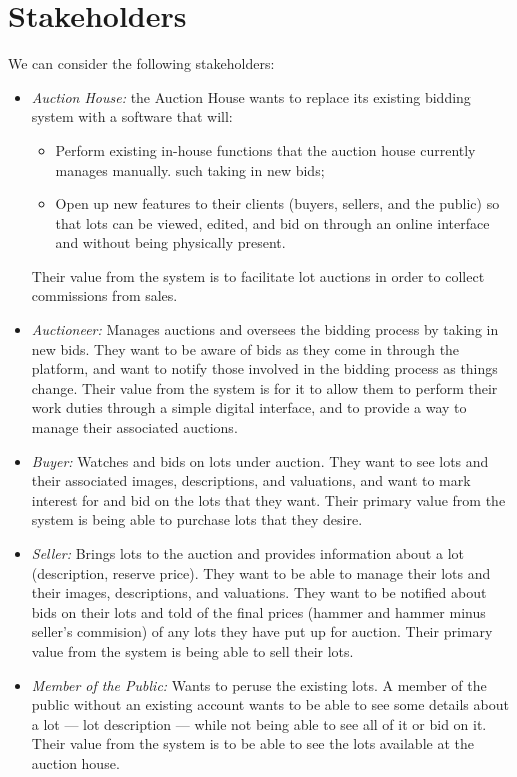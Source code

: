 \documentclass[titlepage, 12pt]{extarticle}
\begin{document}
\section{Stakeholders}
We can consider the following stakeholders:
\begin{itemize}
\item {\it Auction House:} the Auction House wants to replace its existing bidding system with a software that will:
  \begin{itemize}
  \item Perform existing in-house functions that the auction house currently manages manually. such taking in new bids;
  \item Open up new features to their clients (buyers, sellers, and the public) so that lots can be viewed, edited, and bid on through an online interface and without being physically present.
  \end{itemize}
  Their value from the system is to facilitate lot auctions in order to collect commissions from sales.
\item {\it Auctioneer:} Manages auctions and oversees the bidding process by taking in new bids. They want to be aware of bids as they come in through the platform, and want to notify those involved in the bidding process as things change. Their value from the system is for it to allow them to perform their work duties through a simple digital interface, and to provide a way to manage their associated auctions.
\item {\it Buyer:} Watches and bids on lots under auction. They want to see lots and their associated images, descriptions, and valuations, and want to mark interest for and bid on the lots that they want. Their primary value from the system is being able to purchase lots that they desire. 
\item {\it Seller:} Brings lots to the auction and provides information about a lot (description, reserve price). They want to be able to manage their lots and their images, descriptions, and valuations. They want to be notified about bids on their lots and told of the final prices (hammer and hammer minus seller's commision) of any lots they have put up for auction. Their primary value from the system is being able to sell their lots. 
\item {\it Member of the Public:} Wants to peruse the existing lots. A member of the public without an existing account wants to be able to see some details about a lot --- lot description --- while not being able to see all of it or bid on it. Their value from the system is to be able to see the lots available at the auction house. 

\end{itemize}
\end{document}

